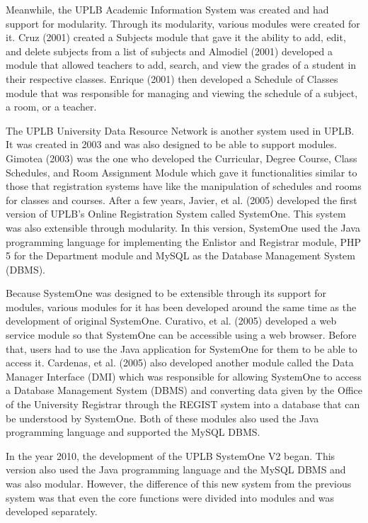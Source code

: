 \documentclass{sigchi}
\begin{document}
Meanwhile, the UPLB Academic Information System was created and had support for
modularity. Through its modularity, various modules were created for it. Cruz (2001) created a
Subjects module that gave it the ability to add, edit, and delete subjects from a list of subjects and
Almodiel (2001) developed a module that allowed teachers to add, search, and view the grades of
a student in their respective classes. Enrique (2001) then developed a Schedule of Classes
module that was responsible for managing and viewing the schedule of a subject, a room, or a
teacher.

The UPLB University Data Resource Network is another system used in UPLB. It was
created in 2003 and was also designed to be able to support modules. Gimotea (2003) was the
one who developed the Curricular, Degree Course, Class Schedules, and Room Assignment
Module which gave it functionalities similar to those that registration systems have like the
manipulation of schedules and rooms for classes and courses.
After a few years, Javier, et al. (2005) developed the first version of UPLB’s Online
Registration System called SystemOne. This system was also extensible through modularity. In
this version, SystemOne used the Java programming language for implementing the Enlistor and
Registrar module, PHP 5 for the Department module and MySQL as the Database Management
System (DBMS).

Because SystemOne was designed to be extensible through its support for modules, various
modules for it has been developed around the same time as the development of original
SystemOne. Curativo, et al. (2005) developed a web service module so that SystemOne can be
accessible using a web browser. Before that, users had to use the Java application for SystemOne
for them to be able to access it. Cardenas, et al. (2005) also developed another module called the
Data Manager Interface (DMI) which was responsible for allowing SystemOne to access a
Database Management System (DBMS) and converting data given by the Office of the
University Registrar through the REGIST system into a database that can be understood by
SystemOne. Both of these modules also used the Java programming language and supported the
MySQL DBMS.

In the year 2010, the development of the UPLB SystemOne V2 began. This version also
used the Java programming language and the MySQL DBMS and was also modular. However,
the difference of this new system from the previous system was that even the core functions were
divided into modules and was developed separately.
\end{document}
